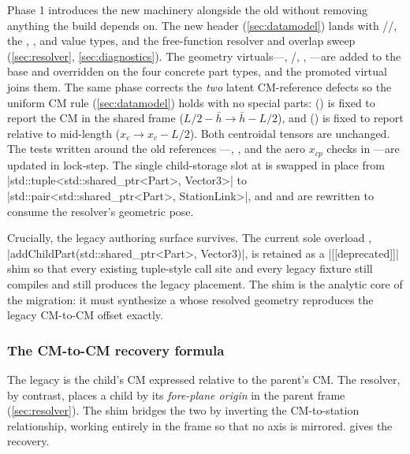 Phase 1 introduces the new machinery alongside the old without removing anything the
build depends on. The new header 
(\cref{sec:datamodel}) lands with //, the
, , and  value types, and the free-function
resolver and overlap sweep (\cref{sec:resolver}, \cref{sec:diagnostics}). The geometry
virtuals---, /,
, ---are added to the base  and overridden on
the four concrete part types, and the promoted  virtual joins them. The
same phase corrects the \emph{two} latent CM-reference defects so the uniform CM rule
(\cref{sec:datamodel}) holds with no special parts: 
() is fixed to report the CM in the shared \zfwd{} frame
($L/2 - \bar h \rightarrow \bar h - L/2$), and 
() is fixed to report relative to mid-length ($x_c \rightarrow
x_c - L/2$). Both centroidal tensors are unchanged. The tests written around the old references
---, , and the aero $x_{cp}$
checks in ---are updated in lock-step. The single child-storage
slot at  is swapped in place from
\cppinline|std::tuple<std::shared_ptr<Part>, Vector3>| to
\cppinline|std::pair<std::shared_ptr<Part>, StationLink>|, and
 and  are rewritten to
consume the resolver's geometric pose.

Crucially, the legacy authoring surface survives. The current sole overload
, \cppinline|addChildPart(std::shared_ptr<Part>, Vector3)|,
is retained as a \cppinline|[[deprecated]]| shim so that every existing tuple-style call
site and every legacy  fixture still compiles and still produces the
legacy placement. The shim is the analytic core of the migration: it must synthesize a
 whose resolved geometry reproduces the legacy CM-to-CM offset
exactly.

\subsubsection{The CM-to-CM recovery formula}

The legacy  is the child's CM expressed relative to the parent's CM. The
resolver, by contrast, places a child by its \emph{fore-plane origin} in the parent
frame (\cref{sec:resolver}). The shim bridges the two by inverting the CM-to-station
relationship, working entirely in the \zfwd{} frame so that no axis is mirrored.
 gives the recovery.

